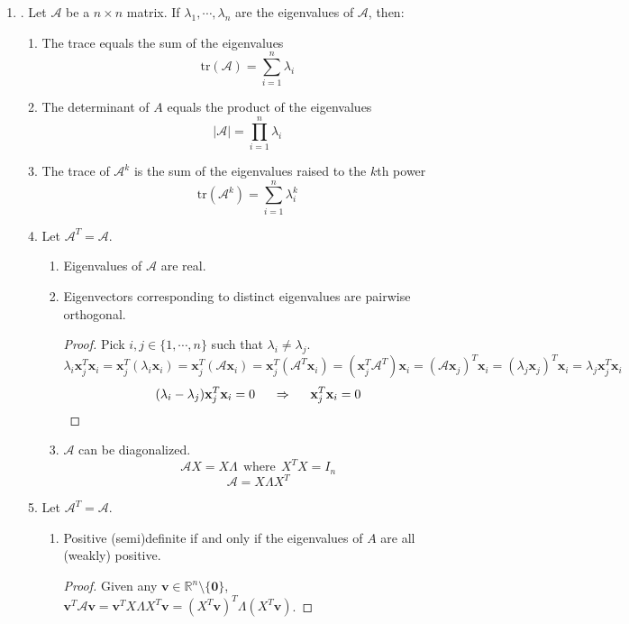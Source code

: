 \documentclass[12pt]{article}
\begin{document}
\begin{enumerate}
\begin{enumerate}
	\item\underline{}.
		Let $\mathcal{A}$ be a $n\times n$ matrix. If $\lambda_1,\cdots,\lambda_n$ are the eigenvalues of $\mathcal{A}$, then:
		\begin{enumerate}
			\item The trace equals the sum of the eigenvalues
					\[\text{tr}(\mathcal{A})=\sum_{i=1}^n\lambda_i\]
			\item The determinant of $A$ equals the product of the eigenvalues
					\[|\mathcal{A}|=\prod_{i=1}^n\lambda_i\]
			\item The trace of $\mathcal{A}^k$ is the sum of the eigenvalues raised to the $k$th power
				\[\text{tr}(\mathcal{A}^k)=\sum_{i=1}^n\lambda_i^k\]
			\item Let $\mathcal{A}^T=\mathcal{A}$.
				\begin{enumerate}
					\item Eigenvalues of $\mathcal{A}$ are real. 
					\item Eigenvectors corresponding to distinct eigenvalues are pairwise orthogonal. 
						\begin{proof} 
							Pick $i, j \in \{1, \cdots, n\}$ such that $\lambda_i \neq \lambda_j$. 
							\[\lambda_i \mathbf{x}_j^T\mathbf{x}_i = \mathbf{x}_j^T (\lambda_i \mathbf{x}_i) = \mathbf{x}_j^T (\mathcal{A} \mathbf{x}_i) =  \mathbf{x}_j^T (\mathcal{A}^T \mathbf{x}_i) = (\mathbf{x}_j^T \mathcal{A}^T) \mathbf{x}_i = (\mathcal{A} \mathbf{x}_j)^T \mathbf{x}_i = (\lambda_j \mathbf{x}_j)^T \mathbf{x}_i = \lambda_j \mathbf{x}_j^T \mathbf{x}_i\]
							\[(\lambda_i - \lambda_j) \mathbf{x}_j^T \mathbf{x}_i = 0 \hspace{5mm} \Rightarrow \hspace{5mm} \mathbf{x}_j^T \mathbf{x}_i = 0 \] 
						\end{proof}
					\item $\mathcal{A}$ can be diagonalized. 
						\[\mathcal{A}X = X \Lambda \ \ \text{where} \ \ X^TX=I_n \] 
						\[ \mathcal{A}= X\Lambda X^T  \]
				\end{enumerate}
			\item Let $\mathcal{A}^T=\mathcal{A}$. 
				\begin{enumerate}
					\item Positive (semi)definite if and only if the eigenvalues of $A$ are all (weakly) positive.
					\begin{proof} Given any $\mathbf{v} \in \mathbb{R}^n \setminus \{\mathbf{0}\}$, $\mathbf{v}^T \mathcal{A} \mathbf{v}= \mathbf{v}^T X\Lambda X^T \mathbf{v}  = (X^T \mathbf{v})^T \Lambda (X^T \mathbf{v})$. \end{proof} 

\end{enumerate}
\end{enumerate}
\end{enumerate}
\end{enumerate}
\end{document}
